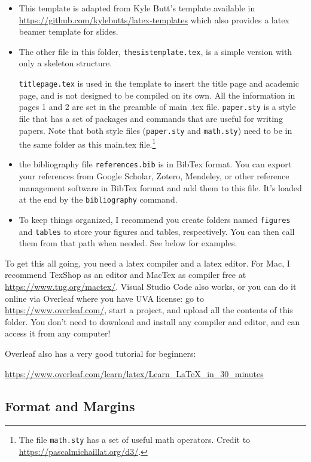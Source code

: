 \documentclass[12pt]{article}
\begin{document}
\begin{itemize}
  \item This template is adapted from Kyle Butt's template available in 
  \href{https://github.com/kylebutts/latex-templates}{https://github.com/kylebutts/latex-templates}
  which also provides a latex beamer template for slides. 
  \item The other file in this folder, \texttt{thesistemplate.tex}, is a simple version with only a skeleton structure. 
  
  \texttt{titlepage.tex} is used in the template to insert the title page and academic page, and is not designed to be compiled on its own. All the information in pages 1 and 2 are set in the preamble of main .tex file. \texttt{paper.sty} is a style file that has a set of packages and commands that are useful for writing papers. Note that both style files (\texttt{paper.sty} and \texttt{math.sty}) need to be in the same folder as this main.tex file.\footnote{The file \texttt{math.sty} has a set of useful math operators. Credit to \url{https://pascalmichaillat.org/d3/}.}
  \item the bibliography file \texttt{references.bib} is in BibTex format. You can export your references from Google Scholar, Zotero, Mendeley, or other reference management software in BibTex format and add them to this file. It's loaded at the end by the \texttt{bibliography} command.
  \item To keep things organized, I recommend you create folders named \texttt{figures} and \texttt{tables} to store your figures and tables, respectively. You can then call them from that path when needed. See below for examples.
\end{itemize}


\bigskip

To get this all going, you need a latex compiler and a latex editor. For Mac, I recommend TexShop as an editor and MacTex as compiler free at \url{https://www.tug.org/mactex/}. Visual Studio Code also works, or you can do it online via Overleaf where you have UVA license: go to \url{https://www.overleaf.com/}, start a project, and upload all the contents of this folder. You don't need to download and install any compiler and editor, and can access it from any computer! 

Overleaf also has a very good tutorial for beginners:

\url{https://www.overleaf.com/learn/latex/Learn_LaTeX_in_30_minutes}


\subsection{Format and Margins}
\end{document}
